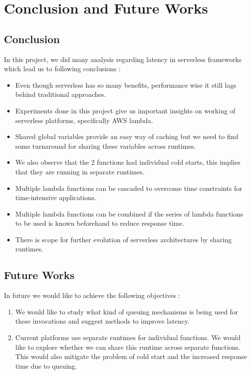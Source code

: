 
\chapter{Conclusion and Future Works} %

\label{Chapter 6} %


\section{Conclusion}

In this project, we did many analysis regarding latency in serverless frameworks which lead us to following conclusions :

\begin{itemize}
    \item Even though serverless has so many benefits, performance wise it still lags behind traditional approaches.
    \item Experiments done in this project give us important insights on working of serverless platforms, specifically AWS lambda.
    \item Shared global variables provide an easy way of caching but we need to find some turnaround for sharing these variables across runtimes.
    \item We also observe that the 2 functions had individual cold starts, this implies that they are running in separate runtimes.
    \item Multiple lambda functions can be cascaded to overcome time constraints for time-intensive applications.
    \item Multiple lambda functions can be combined if the series of lambda functions to be used is known beforehand to reduce response time.
    \item There is scope for further evolution of serverless architectures by sharing runtimes.
\end{itemize}

\section{Future Works}

In future we would like to achieve the following objectives :
\begin{enumerate}
    \item We would like to study what kind of queuing mechanisms is being used for these invocations and suggest methods to improve latency.
    \item Current platforms use separate runtimes for individual functions. We would like to explore whether we can share this runtime across separate functions. This would also mitigate the problem of cold start and the increased response time due to queuing.
\end{enumerate}